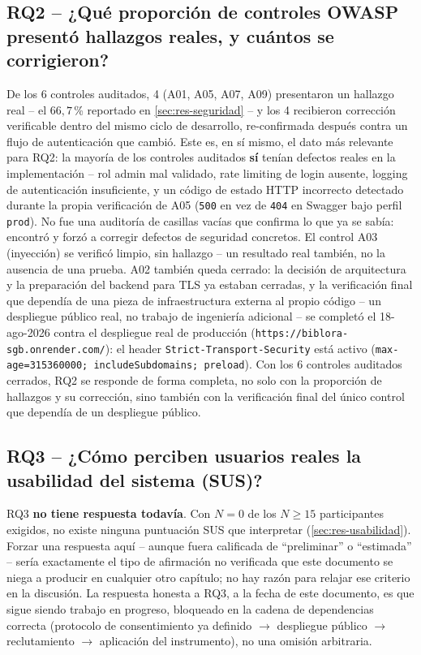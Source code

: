 \subsection*{RQ2 -- ¿Qué proporción de controles OWASP presentó hallazgos reales, y cuántos se corrigieron?}

De los 6 controles auditados, 4 (A01, A05, A07, A09) presentaron un
hallazgo real -- el $66{,}7$\,\% reportado en
\autoref{sec:res-seguridad} -- y los 4 recibieron corrección verificable
dentro del mismo ciclo de desarrollo, re-confirmada después contra un
flujo de autenticación que cambió. Este es, en sí mismo, el dato más
relevante para RQ2: la mayoría de los controles auditados \textbf{sí}
tenían defectos reales en la implementación -- rol admin mal validado,
rate limiting de login ausente, logging de autenticación insuficiente, y
un código de estado HTTP incorrecto detectado durante la propia
verificación de A05 (\texttt{500} en vez de \texttt{404} en Swagger bajo
perfil \texttt{prod}). No fue una auditoría de casillas vacías que
confirma lo que ya se sabía: encontró y forzó a corregir defectos de
seguridad concretos. El control A03 (inyección) se verificó limpio, sin
hallazgo -- un resultado real también, no la ausencia de una prueba. A02
también queda cerrado: la decisión de arquitectura y la preparación del
backend para TLS ya estaban cerradas, y la verificación final que
dependía de una pieza de infraestructura externa al propio código -- un
despliegue público real, no trabajo de ingeniería adicional -- se
completó el 18-ago-2026 contra el despliegue real de producción
(\texttt{https://biblora-sgb.onrender.com/}): el header
\texttt{Strict-Transport-Security} está activo
(\texttt{max-age=315360000; includeSubdomains; preload}). Con los 6
controles auditados cerrados, RQ2 se responde de forma completa, no
solo con la proporción de hallazgos y su corrección, sino también con
la verificación final del único control que dependía de un despliegue
público.

\subsection*{RQ3 -- ¿Cómo perciben usuarios reales la usabilidad del sistema (SUS)?}

RQ3 \textbf{no tiene respuesta todavía}. Con $N=0$ de los $N\geq15$
participantes exigidos, no existe ninguna puntuación SUS que interpretar
(\autoref{sec:res-usabilidad}). Forzar una respuesta aquí -- aunque fuera
calificada de ``preliminar'' o ``estimada'' -- sería exactamente el tipo
de afirmación no verificada que este documento se niega a producir en
cualquier otro capítulo; no hay razón para relajar ese criterio en la
discusión. La respuesta honesta a RQ3, a la fecha de este documento, es
que sigue siendo trabajo en progreso, bloqueado en la cadena de
dependencias correcta (protocolo de consentimiento ya definido
$\to$ despliegue público $\to$ reclutamiento $\to$ aplicación del
instrumento), no una omisión arbitraria.

